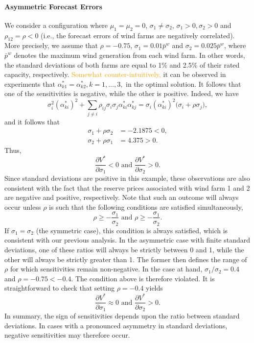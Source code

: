 \documentclass{article}
\begin{document}
\paragraph{Asymmetric Forecast Errors} We consider a configuration where $\mu_1 = \mu_2 = 0$, $\sigma_1 \ne \sigma_2$, $\sigma_1 > 0, \sigma_2 > 0$ and $\rho_{12} = \rho < 0$ (i.e., the forecast errors of wind farms are negatively correlated). More precisely, we assume that $\rho = -0.75$, $\sigma_1 = 0.01 \bar{p}^w$ and $\sigma_2 = 0.025 \bar{p}^w$, where $\bar{p}^w$ denotes the maximum wind generation from each wind farm. In other words, the standard deviations of both farms are equal to 1\% and 2.5\% of their rated capacity, respectively. \textcolor{orange}{Somewhat counter-intuitively,} it can be observed in experiments that $\alpha_{k1}^* = \alpha_{k2}^*, k = 1, \ldots, 3,$ in the optimal solution. It follows that one of the sensitivities is negative, while the other is positive. Indeed, we have
\begin{equation*}
\sigma_i^2 (\alpha_{ki}^*)^2 + \sum_{j \ne i} \rho_{ij} \sigma_i \sigma_j \alpha_{ki}^* \alpha_{kj}^* = \sigma_i (\alpha_{ki}^*)^2 \big( \sigma_i + \rho \sigma_j \big),
\end{equation*}
and it follows that
\begin{align*}
\sigma_1 + \rho \sigma_2 &= -2.1875 < 0,\\
\sigma_2 + \rho \sigma_1 &= 4.375 > 0.
\end{align*}
Thus, 
\begin{equation*}
\frac{\partial V^*}{\partial \sigma_1} < 0 \mbox{ and } \frac{\partial V^*}{\partial \sigma_2} > 0.
\end{equation*}
Since standard deviations are positive in this example, these observations are also consistent with the fact that the reserve prices associated with wind farm 1 and 2 are negative and positive, respectively. Note that such an outcome will always occur unless $\rho$ is such that the following conditions are satisfied simultaneously, 
\begin{equation*}
\rho \ge -\frac{\sigma_1}{\sigma_2} \mbox{ and } \rho \ge -\frac{\sigma_1}{\sigma_2}.
\end{equation*}
If $\sigma_1 = \sigma_2$ (the symmetric case), this condition is always satisfied, which is consistent with our previous analysis. In the asymmetric case with finite standard deviations, one of these ratios will always be strictly between 0 and 1, while the other will always be strictly greater than 1. The former then defines the range of $\rho$ for which sensitivities remain non-negative. In the case at hand, $\sigma_1/\sigma_2 = 0.4$ and $\rho = -0.75 < -0.4$. The condition above is therefore violated. It is straightforward to check that setting $\rho = -0.4$ yields
\begin{equation*}
\frac{\partial V^*}{\partial \sigma_1} \approx 0 \mbox{ and } \frac{\partial V^*}{\partial \sigma_2} > 0.
\end{equation*}
In summary, the sign of sensitivities depends upon the ratio between standard deviations. In cases with a pronounced asymmetry in standard deviations, negative sensitivities may therefore occur.
\end{document}
